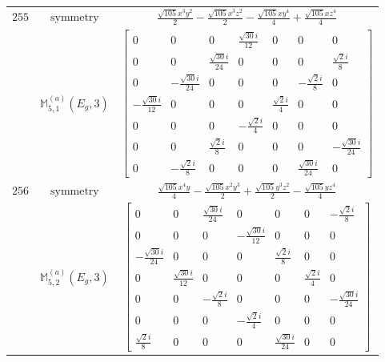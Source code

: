 \documentclass[fleqn,8pt,landscape]{jsarticle}
\begin{document}
\begin{longtable}{ccc}
$ 255 $ & $ \text{symmetry} $ & $ \frac{\sqrt{105} x^{3} y^{2}}{2} - \frac{\sqrt{105} x^{3} z^{2}}{2} - \frac{\sqrt{105} x y^{4}}{4} + \frac{\sqrt{105} x z^{4}}{4} $ \\
$  $ & $ \mathbb{M}_{5,1}^{(a)}(E_{g},3) $ & $ \begin{bmatrix} 0 & 0 & 0 & \frac{\sqrt{30} i}{12} & 0 & 0 & 0 \\ 0 & 0 & \frac{\sqrt{30} i}{24} & 0 & 0 & 0 & \frac{\sqrt{2} i}{8} \\ 0 & - \frac{\sqrt{30} i}{24} & 0 & 0 & 0 & - \frac{\sqrt{2} i}{8} & 0 \\ - \frac{\sqrt{30} i}{12} & 0 & 0 & 0 & \frac{\sqrt{2} i}{4} & 0 & 0 \\ 0 & 0 & 0 & - \frac{\sqrt{2} i}{4} & 0 & 0 & 0 \\ 0 & 0 & \frac{\sqrt{2} i}{8} & 0 & 0 & 0 & - \frac{\sqrt{30} i}{24} \\ 0 & - \frac{\sqrt{2} i}{8} & 0 & 0 & 0 & \frac{\sqrt{30} i}{24} & 0 \end{bmatrix} $ \\ \hline
$ 256 $ & $ \text{symmetry} $ & $ \frac{\sqrt{105} x^{4} y}{4} - \frac{\sqrt{105} x^{2} y^{3}}{2} + \frac{\sqrt{105} y^{3} z^{2}}{2} - \frac{\sqrt{105} y z^{4}}{4} $ \\
$  $ & $ \mathbb{M}_{5,2}^{(a)}(E_{g},3) $ & $ \begin{bmatrix} 0 & 0 & \frac{\sqrt{30} i}{24} & 0 & 0 & 0 & - \frac{\sqrt{2} i}{8} \\ 0 & 0 & 0 & - \frac{\sqrt{30} i}{12} & 0 & 0 & 0 \\ - \frac{\sqrt{30} i}{24} & 0 & 0 & 0 & \frac{\sqrt{2} i}{8} & 0 & 0 \\ 0 & \frac{\sqrt{30} i}{12} & 0 & 0 & 0 & \frac{\sqrt{2} i}{4} & 0 \\ 0 & 0 & - \frac{\sqrt{2} i}{8} & 0 & 0 & 0 & - \frac{\sqrt{30} i}{24} \\ 0 & 0 & 0 & - \frac{\sqrt{2} i}{4} & 0 & 0 & 0 \\ \frac{\sqrt{2} i}{8} & 0 & 0 & 0 & \frac{\sqrt{30} i}{24} & 0 & 0 \end{bmatrix} $ \\ \hline
\end{longtable}
\end{document}
